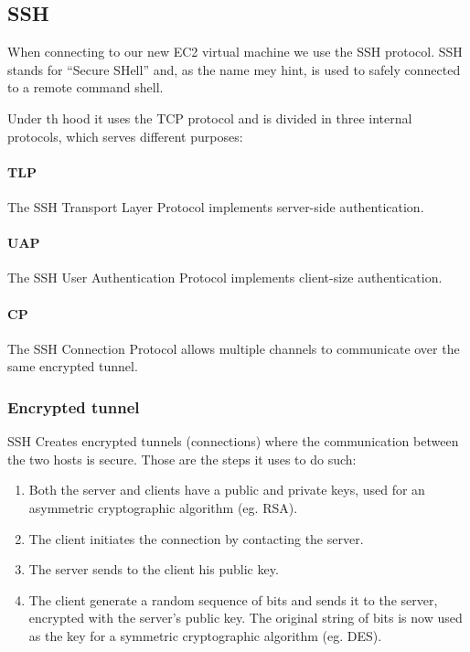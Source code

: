 \subsection{SSH}

When connecting to our new EC2 virtual machine we use the SSH protocol. SSH stands for ``Secure SHell'' and, as the name mey hint, is used to safely connected to a remote command shell.

Under th hood it uses the TCP protocol and is divided in three internal protocols, which serves different purposes:

\paragraph{TLP}
The SSH Transport Layer Protocol implements server-side authentication.

\paragraph{UAP}
The SSH User Authentication Protocol implements client-size authentication.

\paragraph{CP}
The SSH Connection Protocol allows multiple channels to communicate over the same
encrypted tunnel.

\subsubsection{Encrypted tunnel}
SSH Creates encrypted tunnels (connections) where the communication between the two hosts is secure. Those are the steps it uses to do such:
\begin{enumerate}
    \item Both the server and clients have a public and private keys, used for an asymmetric cryptographic algorithm (eg. RSA).
    \item The client initiates the connection by contacting the server.
    \item The server sends to the client his public key.
    \item The client generate a random sequence of bits and sends it to the server, encrypted with the server's public key. The original string of bits is now used as the key for a symmetric cryptographic algorithm (eg. DES).
\end{enumerate}

